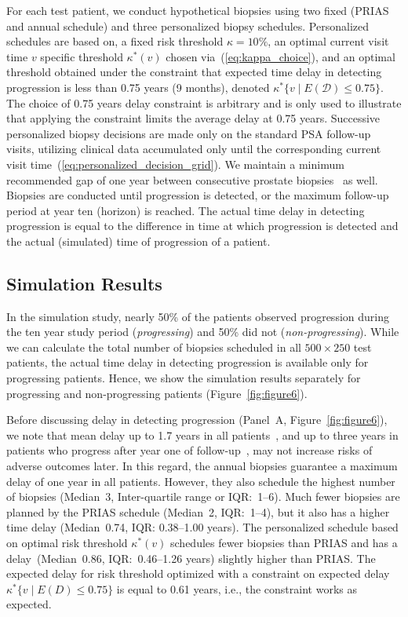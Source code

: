 \documentclass[AMA,STIX1COL]{WileyNJD-v2}
\begin{document}
For each test patient, we conduct hypothetical biopsies using two fixed (PRIAS and annual schedule) and three personalized biopsy schedules. Personalized schedules are based on, a fixed risk threshold $\kappa=10\%$, an optimal current visit time $v$ specific threshold $\kappa^*(v)$ chosen via~(\ref{eq:kappa_choice}), and an optimal threshold obtained under the constraint that expected time delay in detecting progression is less than 0.75 years (9 months), denoted $\kappa^*\{v \mid E(\mathcal{D})\leq 0.75\}$. The choice of 0.75 years delay constraint is arbitrary and is only used to illustrate that applying the constraint limits the average delay at 0.75 years. Successive personalized biopsy decisions are made only on the standard PSA follow-up visits, utilizing clinical data accumulated only until the corresponding current visit time~(\ref{eq:personalized_decision_grid}). We maintain a minimum recommended gap of one year between consecutive prostate biopsies~\citep{bokhorst2015compliance} as well. Biopsies are conducted until progression is detected, or the maximum follow-up period at year ten (horizon) is reached. The actual time delay in detecting progression is equal to the difference in time at which progression is detected and the actual (simulated) time of progression of a patient.

\subsection{Simulation Results}
In the simulation study, nearly 50\% of the patients observed progression during the ten year study period (\emph{progressing}) and 50\% did not (\emph{non-progressing}). While we can calculate the total number of biopsies scheduled in all $500 \times 250$ test patients, the actual time delay in detecting progression is available only for progressing patients. Hence, we show the simulation results separately for progressing and non-progressing patients (Figure~\ref{fig:figure6}).

Before discussing delay in detecting progression (Panel~A, Figure~\ref{fig:figure6}), we note that mean delay up to 1.7 years in all patients~\citep{inoue2018comparative}, and up to three years in patients who progress after year one of follow-up~\citep{carvalho}, may not increase risks of adverse outcomes later. In this regard, the annual biopsies guarantee a maximum delay of one year in all patients. However, they also schedule the highest number of biopsies (Median~3, Inter-quartile range or IQR:~1--6). Much fewer biopsies are planned by the PRIAS schedule (Median~2, IQR:~1--4), but it also has a higher time delay (Median~0.74, IQR: 0.38--1.00 years). The personalized schedule based on optimal risk threshold $\kappa^*(v)$ schedules fewer biopsies than PRIAS and has a delay~(Median~0.86, IQR:~0.46--1.26 years) slightly higher than PRIAS. The expected delay for risk threshold optimized with a constraint on expected delay $\kappa^*\{v \mid E(D)\leq 0.75\}$ is equal to 0.61 years, i.e., the constraint works as expected.
\end{document}
